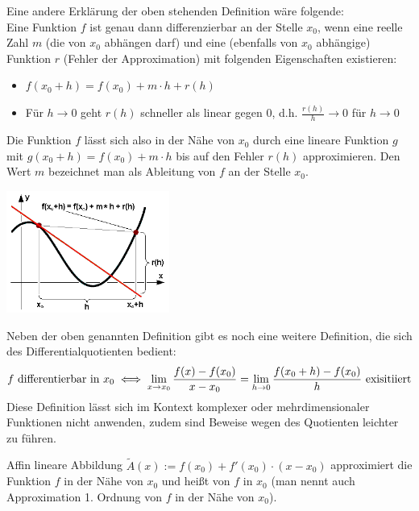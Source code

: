 \begin{*anmerkung}
	Eine andere Erklärung der oben stehenden Definition wäre folgende: \\
	Eine Funktion $f$ ist genau dann differenzierbar an der Stelle $x_0$, wenn eine reelle Zahl $m$ (die von $x_0$ abhängen darf) und eine (ebenfalls von $x_0$ abhängige) Funktion $r$ (Fehler der Approximation) mit folgenden Eigenschaften existieren:
	\begin{itemize}
		\item $f(x_0+h)=f(x_0)+m\cdot h+r(h)$
		\item Für $h\to 0$ geht $r(h)$ schneller als linear gegen 0, d.h. $\frac{r(h)}{h}\to 0$ für $h\to 0$
	\end{itemize}
	Die Funktion $f$ lässt sich also in der Nähe von $x_0$ durch eine lineare Funktion $g$ mit $g(x_0+h)=f(x_0)+m\cdot h$ bis auf den Fehler $r(h)$ approximieren. Den Wert $m$ bezeichnet man als Ableitung von $f$ an der Stelle $x_0$.
	
	\begin{center}\includegraphics[width=0.4\textwidth]{pictures/diff-definition.png}\end{center} %
\end{*anmerkung}

\begin{*anmerkung}
	Neben der oben genannten Definition gibt es noch eine weitere Definition, die sich des Differentialquotienten bedient:
	\begin{align}
		f\text{ differentierbar in }x_0 \iff \lim\limits_{x\to x_0}\frac{f(x)-f(x_0)}{x-x_0}= \lim\limits_{h\to 0}\frac{f(x_0+h)-f(x_0)}{h}\text{ exisitiiert}\notag
	\end{align}
	Diese Definition lässt sich im Kontext komplexer oder mehrdimensionaler Funktionen nicht anwenden, zudem sind Beweise wegen des Quotienten leichter zu führen.
\end{*anmerkung}

\begin{*remark}
	Affin lineare Abbildung $\tilde{A}(x) := f(x_0) + f'(x_0)\cdot(x-x_0)$ approximiert die Funktion $f$ in der Nähe von $x_0$ und heißt  von $f$ in $x_0$ (man nennt  auch Approximation 1. Ordnung von $f$ in der Nähe von $x_0$).
\end{*remark}

